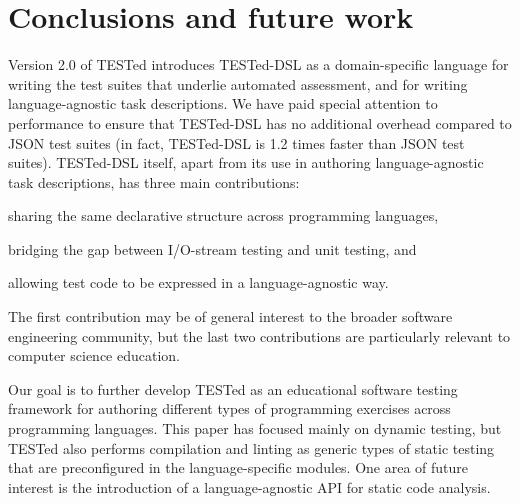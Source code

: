 \documentclass[../main]{subfiles}
\begin{document}
\section{Conclusions and future work}\label{sec:dsl-conclusion-and-future-work}

Version 2.0 of TESTed introduces TESTed-DSL as a domain-specific language for writing the test suites that underlie automated assessment, and for writing language-agnostic task descriptions.
We have paid special attention to performance to ensure that TESTed-DSL has no additional overhead compared to JSON test suites (in fact, TESTed-DSL is 1.2 times faster than JSON test suites).
TESTed-DSL itself, apart from its use in authoring language-agnostic task descriptions, has three main contributions: \begin{enumerate*}[label=\emph{\roman*})] \item sharing the same declarative structure across programming languages, \item bridging the gap between I/O-stream testing and unit testing, and \item allowing test code to be expressed in a language-agnostic way.\end{enumerate*}
The first contribution may be of general interest to the broader software engineering community, but the last two contributions are particularly relevant to computer science education.

Our goal is to further develop TESTed as an educational software testing framework for authoring different types of programming exercises across programming languages.
This paper has focused mainly on dynamic testing, but TESTed also performs compilation and linting as generic types of static testing that are preconfigured in the language-specific modules.
One area of future interest is the introduction of a language-agnostic API for static code analysis.
\end{document}
